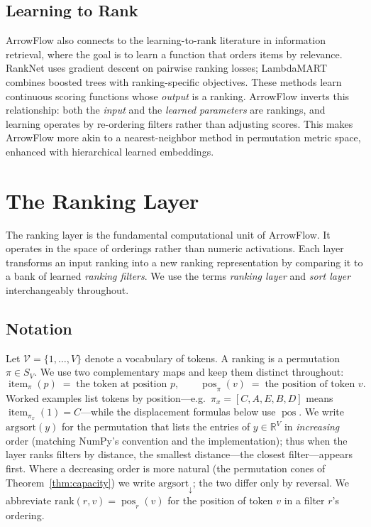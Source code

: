 \documentclass[12pt]{article}
\newcommand{\R}{\mathbb{R}}
\newcommand{\argsort}{\mathrm{argsort}}
\newcommand{\orderdesc}{\mathrm{argsort}_{\downarrow}}
\newcommand{\rankop}{\mathrm{rank}}
\begin{document}
\subsection{Learning to Rank}
ArrowFlow also connects to the learning-to-rank literature in information retrieval, where the goal is to learn a function that orders items by relevance. RankNet \citep{burges2005learning} uses gradient descent on pairwise ranking losses; LambdaMART \citep{burges2010ranknet} combines boosted trees with ranking-specific objectives. These methods learn continuous scoring functions whose \emph{output} is a ranking. ArrowFlow inverts this relationship: both the \emph{input} and the \emph{learned parameters} are rankings, and learning operates by re-ordering filters rather than adjusting scores. This makes ArrowFlow more akin to a nearest-neighbor method in permutation metric space, enhanced with hierarchical learned embeddings.


\section{The Ranking Layer}
\label{sec:ranking-layer}

The ranking layer is the fundamental computational unit of ArrowFlow. It operates in the space of orderings rather than numeric activations. Each layer transforms an input ranking into a new ranking representation by comparing it to a bank of learned \emph{ranking filters}. We use the terms \emph{ranking layer} and \emph{sort layer} interchangeably throughout.

\subsection{Notation}
Let $\mathcal{V} = \{1, \dots, V\}$ denote a vocabulary of tokens. A ranking is a permutation $\pi \in S_V$. We use two complementary maps and keep them distinct throughout:
\[
\operatorname{item}_\pi(p) \;=\; \text{the token at position } p, \qquad
\operatorname{pos}_\pi(v) \;=\; \text{the position of token } v.
\]
Worked examples list tokens by position---e.g.\ $\pi_x = [C,A,E,B,D]$ means $\operatorname{item}_{\pi_x}(1)=C$---while the displacement formulas below use $\operatorname{pos}$. We write $\argsort(y)$ for the permutation that lists the entries of $y \in \R^V$ in \emph{increasing} order (matching NumPy's convention and the implementation); thus when the layer ranks filters by distance, the smallest distance---the closest filter---appears first. Where a decreasing order is more natural (the permutation cones of Theorem~\ref{thm:capacity}) we write $\orderdesc$; the two differ only by reversal. We abbreviate $\rankop(r, v) = \operatorname{pos}_r(v)$ for the position of token $v$ in a filter $r$'s ordering.
\end{document}

